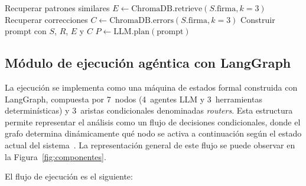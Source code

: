 \begin{algorithm}[H]
\caption{Módulo de planificación}
\label{alg:planificacion}
Recuperar patrones similares $E \leftarrow
    \text{ChromaDB.retrieve}(S.\text{firma}, k=3)$\;
Recuperar correcciones $C \leftarrow
    \text{ChromaDB.errors}(S.\text{firma}, k=3)$\;
Construir prompt con $S$, $R$, $E$ y $C$\;
$P \leftarrow \text{LLM.plan}(\text{prompt})$
\;
\end{algorithm}

\subsection{Módulo de ejecución agéntica con LangGraph}

La ejecución se implementa como una máquina de estados formal construida con LangGraph, compuesta por 7~nodos (4~agentes LLM y 3~herramientas determinísticas) y 3~aristas condicionales denominadas \textit{routers}. Esta estructura permite representar el análisis como un flujo de decisiones condicionales, donde el grafo determina dinámicamente qué nodo se activa a continuación según el estado actual del sistema~\cite{blefari2026cyberrag}. La representación general de este flujo se puede observar en la Figura~\ref{fig:componentes}.


El flujo de ejecución es el siguiente:

